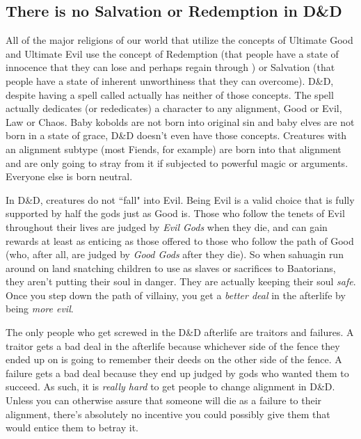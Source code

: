 \subsection{There is no Salvation or Redemption in D\&D}
All of the major religions of our world that utilize the concepts of Ultimate Good and Ultimate Evil use the concept of Redemption (that people have a state of innocence that they can lose and perhaps regain through ) or Salvation (that people have a state of inherent unworthiness that they can overcome). D\&D, despite having a spell called  actually has neither of those concepts. The  spell actually dedicates (or rededicates) a character to any alignment, Good or Evil, Law or Chaos. Baby kobolds are not born into original sin and baby elves are not born in a state of grace, D\&D doesn't even have those concepts. Creatures with an alignment subtype (most Fiends, for example) are born into that alignment and are only going to stray from it if subjected to powerful magic or arguments. Everyone else is born neutral.

In D\&D, creatures do not ``fall" into Evil. Being Evil is a valid choice that is fully supported by half the gods just as Good is. Those who follow the tenets of Evil throughout their lives are judged by \textit{Evil Gods} when they die, and can gain rewards at least as enticing as those offered to those who follow the path of Good (who, after all, are judged by \textit{Good Gods} after they die). So when sahuagin run around on land snatching children to use as slaves or sacrifices to Baatorians, they aren't putting their soul in danger. They are actually keeping their soul \textit{safe}. Once you step down the path of villainy, you get a \textit{better deal} in the afterlife by being \textit{more evil}.

The only people who get screwed in the D\&D afterlife are traitors and failures. A traitor gets a bad deal in the afterlife because whichever side of the fence they ended up on is going to remember their deeds on the other side of the fence. A failure gets a bad deal because they end up judged by gods who wanted them to succeed. As such, it is \textit{really hard} to get people to change alignment in D\&D. Unless you can otherwise assure that someone will die as a failure to their alignment, there's absolutely no incentive you could possibly give them that would entice them to betray it.

